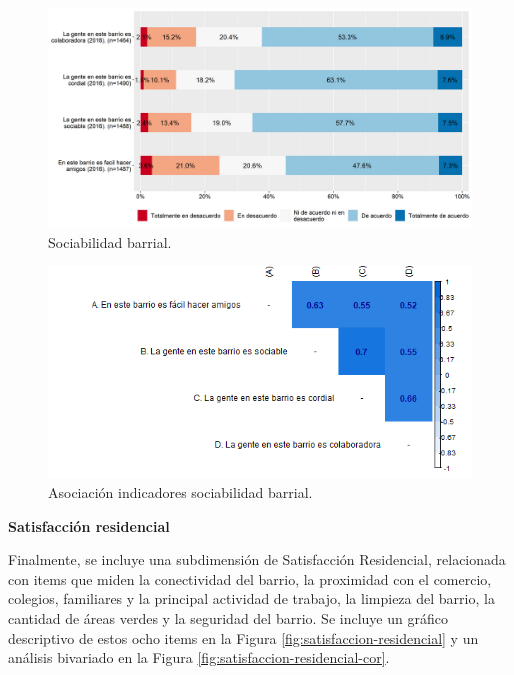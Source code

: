 \documentclass[
  12pt,
]{book}
\begin{document}
\begin{figure}[H]

{\centering \includegraphics[width=1\linewidth,height=1\textheight]{output/graphs/sociabilidad-barrial} 

}

\caption{Sociabilidad barrial.}\label{fig:sociabilidad-barrial}
\end{figure}

\begin{figure}[H]

{\centering \includegraphics[width=1\linewidth,height=1\textheight]{output/graphs/sociabilidad-barrial_cor} 

}

\caption{Asociación indicadores sociabilidad barrial.}\label{fig:sociabilidad-barrial-cor}
\end{figure}

\textbf{Satisfacción residencial}

Finalmente, se incluye una subdimensión de Satisfacción Residencial, relacionada con items que miden la conectividad del barrio, la proximidad con el comercio, colegios, familiares y la principal actividad de trabajo, la limpieza del barrio, la cantidad de áreas verdes y la seguridad del barrio. Se incluye un gráfico descriptivo de estos ocho items en la Figura \ref{fig:satisfaccion-residencial} y un análisis bivariado en la Figura \ref{fig:satisfaccion-residencial-cor}.
\end{document}
